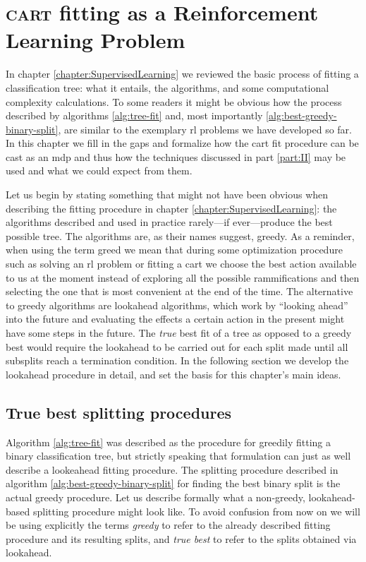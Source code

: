 \chapter{\textsc{cart} fitting as a Reinforcement Learning Problem}
\label{chapter:CARTasRLP}

In chapter \ref{chapter:SupervisedLearning} we reviewed the basic process of
fitting a classification tree: what it entails, the algorithms, and some
computational complexity calculations. To some readers it might be obvious how
the process described by algorithms \ref{alg:tree-fit} and, most importantly
\ref{alg:best-greedy-binary-split}, are similar to the exemplary \ac{rl}
problems we have developed so far. In this chapter we fill in the gaps and
formalize how the \ac{cart} fit procedure can be cast as an \ac{mdp} and thus how the
techniques discussed in part \ref{part:II} may be used and what we could expect
from them.

Let us begin by stating something that might not have been obvious when
describing the fitting procedure in chapter \ref{chapter:SupervisedLearning}:
the algorithms described and used in practice rarely---if ever---produce the
best possible tree. The algorithms are, as their names suggest, greedy. As a
reminder, when using the term greed we mean that during some optimization
procedure such as solving an \ac{rl} problem or fitting a \ac{cart} we choose
the best action available to us at the moment instead of exploring all the
possible rammifications and then selecting the one that is most convenient at
the end of the time. The alternative to greedy algorithms are lookahead
algorithms, which work by ``looking ahead'' into the future and evaluating the
effects a certain action in the present might have some steps in the future. The
\emph{true} best fit of a tree as opposed to a greedy best would require the
lookahead to be carried out for each split made until all subsplits reach a
termination condition. In the following section we develop the lookahead
procedure in detail, and set the basis for this chapter's main ideas.

\section{True best splitting procedures}

Algorithm \ref{alg:tree-fit} was described as the procedure for greedily fitting
a binary classification tree, but strictly speaking that formulation can just as
well describe a lookeahead fitting procedure. The splitting procedure described
in algorithm \ref{alg:best-greedy-binary-split} for finding the best binary
split is the actual greedy procedure. Let us describe formally what a
non-greedy, lookahead-based splitting procedure might look like. To avoid
confusion from now on we will be using explicitly the terms \emph{greedy} to
refer to the already described fitting procedure and its resulting splits, and
\emph{true best} to refer to the splits obtained via lookahead. 

